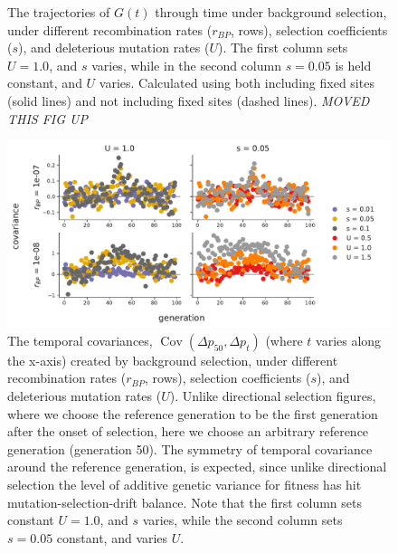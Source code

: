 \documentclass[11pt]{article}
\newcommand{\gc}[1]{{\it \color{red} #1 } }
\DeclareMathOperator{\cov}{Cov}
\begin{document}
{\begin{figure}[!ht]
  \caption{The trajectories of $G(t)$ through time under background selection,
    under different recombination rates ($r_{BP}$, rows), selection
    coefficients ($s$), and deleterious mutation rates ($U$). The first column
    sets $U = 1.0$, and $s$ varies, while in the second column $s=0.05$ is held
  constant, and $U$ varies. Calculated using both
  including fixed sites (solid lines) and not including fixed sites (dashed
lines). \gc{MOVED THIS FIG UP} }

  \label{suppfig:supp-bgs-g-fix}
\end{figure}

\begin{figure}[!ht]
  \centering
  \includegraphics[width=\textwidth]{figures/fig-bgs-covars-without-fixations.pdf}

  \caption{The temporal covariances, $\cov(\Delta p_{50}, \Delta p_t)$ (where
    $t$ varies along the x-axis) created by background selection, under
    different recombination rates ($r_{BP}$, rows), selection coefficients
    ($s$), and deleterious mutation rates ($U$). Unlike directional selection
    figures, where we choose the reference generation to be the first
    generation after the onset of selection, here we choose an arbitrary
    reference generation (generation 50). The symmetry of temporal covariance
    around the reference generation, is expected, since unlike directional
    selection the level of additive genetic variance for fitness has hit
    mutation-selection-drift balance. Note that the first column sets constant
  $U = 1.0$, and $s$ varies, while the second column sets $s=0.05$ constant,
and varies $U$.}

  \label{suppfig:supp-bgs-covs}
\end{figure}






}
\end{document}
